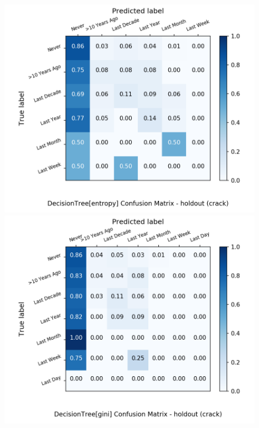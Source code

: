 \begin{figure}[H]
	\centering
	\begin{minipage}[b]{0.32\textwidth}
		\includegraphics[width=1.1\textwidth]{Plots/drugs/crack_DecisionTree_entropy_balance_False_holdout.png}
	\end{minipage}
	\begin{minipage}[b]{0.32\textwidth}
		\includegraphics[width=1.1\textwidth]{Plots/drugs/crack_DecisionTree_gini_balance_False_holdout.png}
	\end{minipage}
	\begin{minipage}[b]{0.32\textwidth}

\end{minipage}
\end{figure}
